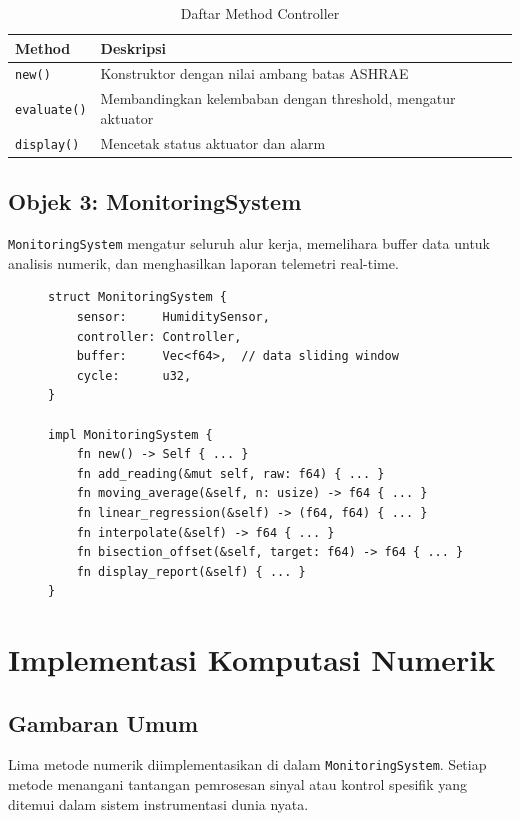 \documentclass[journal]{IEEEtran}
\begin{document}
\begin{table}[H]
  \centering
  \caption{Daftar Method Controller}
  \begin{tabular}{@{}ll@{}}
    \toprule
    \textbf{Method} & \textbf{Deskripsi} \\
    \midrule
    \texttt{new()}      & Konstruktor dengan nilai ambang batas ASHRAE \\
    \texttt{evaluate()} & Membandingkan kelembaban dengan threshold, mengatur aktuator \\
    \texttt{display()}  & Mencetak status aktuator dan alarm \\
    \bottomrule
  \end{tabular}
\end{table}

\subsection{Objek 3: MonitoringSystem}
\texttt{MonitoringSystem} mengatur seluruh alur kerja, memelihara buffer data untuk analisis numerik, dan menghasilkan laporan telemetri real-time.

\begin{figure}[H]
\begin{lstlisting}[caption={Struct MonitoringSystem}]
struct MonitoringSystem {
    sensor:     HumiditySensor,
    controller: Controller,
    buffer:     Vec<f64>,  // data sliding window
    cycle:      u32,
}

impl MonitoringSystem {
    fn new() -> Self { ... }
    fn add_reading(&mut self, raw: f64) { ... }
    fn moving_average(&self, n: usize) -> f64 { ... }
    fn linear_regression(&self) -> (f64, f64) { ... }
    fn interpolate(&self) -> f64 { ... }
    fn bisection_offset(&self, target: f64) -> f64 { ... }
    fn display_report(&self) { ... }
}
\end{lstlisting}
\end{figure}

\section{Implementasi Komputasi Numerik}

\subsection{Gambaran Umum}
Lima metode numerik diimplementasikan di dalam \texttt{MonitoringSystem}. Setiap metode menangani tantangan pemrosesan sinyal atau kontrol spesifik yang ditemui dalam sistem instrumentasi dunia nyata.
\end{document}
